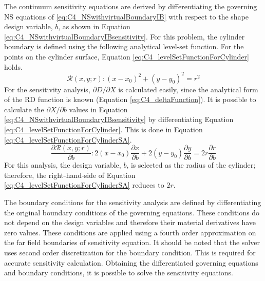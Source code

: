 %
The continuum sensitivity equations are derived by differentiating the governing NS equations of \eqref{eq:C4_NSwithvirtualBoundaryIB} with respect to the shape design variable, $b$, as shown in Equation \eqref{eq:C4_NSwithvirtualBoundaryIBsensitivity}. For this problem, the cylinder boundary is defined using the following analytical level-set function. For the points on the cylinder surface, Equation \eqref{eq:C4_levelSetFunctionForCylinder} holds.
%
\begin{equation}\label{eq:C4_levelSetFunctionForCylinder}
	\mathcal{R}(x, y; r): (x - x_0)^2 + (y - y_0)^2 = r^2
\end{equation}
%
For the sensitivity analysis, $\partial D/\partial X$ is calculated easily, since the analytical form of the RD function is known (Equation \eqref{eq:C4_deltaFunction}). It is possible to calculate the $\partial X/\partial b$ values in Equation \eqref{eq:C4_NSwithvirtualBoundaryIBsensitivity} by differentiating Equation \eqref{eq:C4_levelSetFunctionForCylinder}. This is done in Equation \eqref{eq:C4_levelSetFunctionForCylinderSA}.
%
\begin{equation}\label{eq:C4_levelSetFunctionForCylinderSA}
	\frac{\partial \mathcal{R}(x, y; r)}{\partial b}: 
	2 (x - x_0)\dfrac{\partial x}{\partial b} + 
	2 (y - y_0)\frac{\partial y}{\partial b} = 
	2 r \frac{\partial r}{\partial b}
\end{equation}
%
For this analysis, the design variable, $b$, is selected as the radius of the cylinder; therefore, the right-hand-side of Equation \eqref{eq:C4_levelSetFunctionForCylinderSA} reduces to $2r$.

The boundary conditions for the sensitivity analysis are defined by differentiating the original boundary conditions of the governing equations. These conditions do not depend on the design variables and therefore their material derivatives have zero values. These conditions are applied using a fourth order approximation on the far field boundaries of sensitivity equation. It should be noted that the solver uses second order discretization for the boundary condition. This is required for accurate sensitivity calculation. Obtaining the differentiated governing equations and boundary conditions, it is possible to solve the sensitivity equations.

